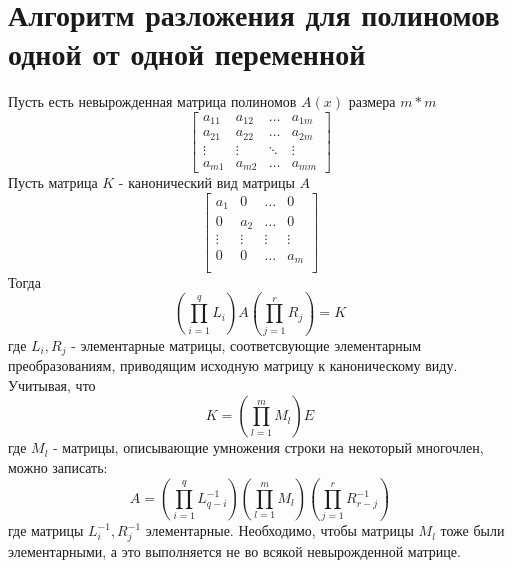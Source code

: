 \documentclass[14pt, a4paper]{extreport}
\begin{document}
	\section{Алгоритм разложения для полиномов одной от одной переменной}
	Пусть есть невырожденная матрица полиномов $A(x)$ размера $m*m$
	\[
		\begin{bmatrix}
			a_{11} & a_{12} & \dots & a_{1m} \\
			a_{21} & a_{22} & \dots & a_{2m} \\
			\vdots & \vdots & \ddots & \vdots \\
			a_{m1} & a_{m2} & \dots & a_{mm}
		\end{bmatrix}
	\]
	Пусть матрица $K$ - канонический вид матрицы $A$
	\[
		\begin{bmatrix}
			a_{1} & 0 & \dots & 0 \\
			0 & a_{2} & \dots & 0 \\
			\vdots & \vdots & \vdots & \vdots \\
			0 & 0 & \dots & a_{m} \\
		\end{bmatrix}
	\]
	Тогда
	\begin{equation*}
		(\prod\limits_{i=1}^{q}L_{i})A(\prod\limits_{j=1}^{r}R_{j}) = K
	\end{equation*}
	где $L_{i},R_{j}$ - элементарные матрицы, соответсвующие элементарным преобразованиям,
	приводящим исходную матрицу к каноническому виду.\\
	Учитывая, что
	\begin{equation*}
		K = (\prod\limits_{l=1}^{m}M_{l})E
	\end{equation*}
	где $M_{l}$ - матрицы, описывающие умножения строки на некоторый многочлен, можно записать:
	\begin{equation*}
		\label{final:form}
		A =
		(\prod\limits_{i=1}^{q}L_{q-i}^{-1})
		(\prod\limits_{l=1}^{m}M_{l})
		(\prod\limits_{j=1}^{r}R_{r-j}^{-1})
	\end{equation*}
	где матрицы $L_{i}^{-1},R_{j}^{-1}$ элементарные. Необходимо, чтобы матрицы $M_{l}$ тоже были
	элементарными, а это выполняется не во всякой невырожденной матрице.
\end{document}
